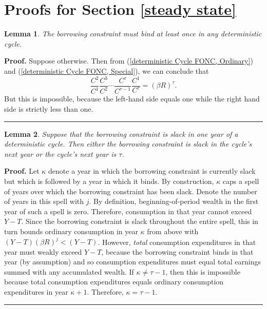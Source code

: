 \documentclass[fleqccn,12pt]{article}
\newtheorem{lemma}{Lemma}
\newenvironment{proof}[1][Proof]{\noindent\textbf{#1.} }{\ \rule{0.5em}{0.5em}}
\begin{document}
\newpage
\appendix

\section{Proofs for Section \ref{steady state}}
\begin{lemma}\label{constraint binding lemma}
The borrowing constraint must bind at least once in any deterministic cycle.
\end{lemma}
\begin{proof}
Suppose otherwise. Then from (\ref{deterministic Cycle FONC, Ordinary}) and (\ref{deterministic Cycle FONC, Special}), we can conclude that
\[\frac{C^2}{C^1}\frac{C^3}{C^2}\cdots\frac{C^{\tau}}{C^{\tau-1}}\frac{C^1}{C^\tau} = (\beta R)^\tau. \]
But this is impossible, because the left-hand side equals one while the right hand side is strictly less than one. 
\end{proof}

\begin{lemma} \label{constraint timing lemma}
Suppose that the borrowing constraint is slack in one year of a deterministic cycle. Then either the borrowing constraint is slack in the cycle's next year or the cycle's next year is $\tau$.
\end{lemma}
\begin{proof}
Let $\kappa$ denote a year in which the borrowing constraint is currently slack but which is followed by a year in which it binds. By construction, $\kappa$ caps a spell of years over which the borrowing constraint has been slack. Denote the number of years in this spell with $j$.  By definition, beginning-of-period wealth in the first year of such a spell is zero. Therefore, consumption in that year cannot exceed $Y-T$. Since the borrowing constraint is slack throughout the entire spell, this in turn bounds ordinary consumption in year $\kappa$ from above with $(Y-T)(\beta R)^j<(Y-T) $. However, \emph{total} consumption expenditures in that year must weakly exceed $Y-T$, because the borrowing constraint binds in that year (by assumption) and so consumption expenditures must equal total earnings summed with any accumulated wealth. If $\kappa\neq \tau-1$, then this is impossible because total consumption expenditures equals ordinary consumption expenditures in year $\kappa+1$. Therefore, $\kappa=\tau-1$. 
\end{proof}

\bigskip
\end{document}
